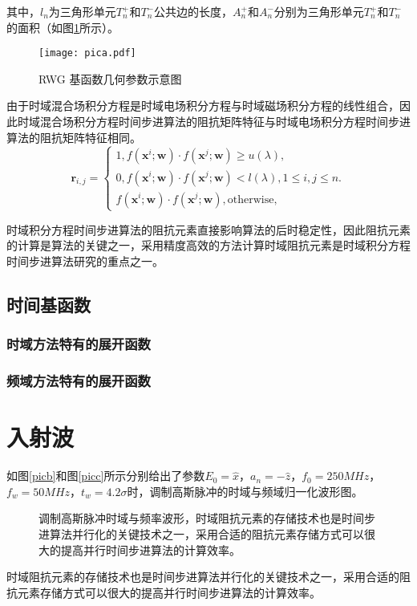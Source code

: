 \documentclass{standalone}
\begin{document}
其中，$l_n$为三角形单元$T_n^+$和$T_n^-$公共边的长度，$A_n^+$和$A_n^-$分别为三角形单元$T_n^+$和$T_n^-$的面积（如图\ref{pica}所示）。

\begin{figure}[h]
	\texttt{[image: pica.pdf]}
	\caption{RWG 基函数几何参数示意图}
	\label{pica}
\end{figure}
由于时域混合场积分方程是时域电场积分方程与时域磁场积分方程的线性组合，因此时域混合场积分方程时间步进算法的阻抗矩阵特征与时域电场积分方程时间步进算法的阻抗矩阵特征相同。
\begin{equation}
\label{latent_binary_variable}
\mathbf{r}_{i,j}=
\begin{cases}
1,f(\mathbf{x}^{i};\mathbf{w})\cdot f(\mathbf{x}^{j};\mathbf{w})\geq u(\lambda),\\
0,f(\mathbf{x}^{i};\mathbf{w})\cdot f(\mathbf{x}^{j};\mathbf{w})< l(\lambda), 1\leq i,j\leq n.\\
f(\mathbf{x}^{i};\mathbf{w})\cdot f(\mathbf{x}^{j};\mathbf{w}),\text{otherwise},
\end{cases}
\end{equation}

时域积分方程时间步进算法的阻抗元素直接影响算法的后时稳定性，因此阻抗元素的计算是算法的关键之一，采用精度高效的方法计算时域阻抗元素是时域积分方程时间步进算法研究的重点之一。


\subsection{时间基函数}

\subsubsection{时域方法特有的展开函数}

\subsubsection{频域方法特有的展开函数}

\section{入射波}

如图\ref{picb}和图\ref{picc}所示分别给出了参数$E_0=\hat{x}$，$a_n=-\hat{z}$，$f_0=250MHz$，$f_w=50MHz$，$t_w=4.2\sigma$时，调制高斯脉冲的时域与频域归一化波形图。

\begin{figure}[h]
	\caption{调制高斯脉冲时域与频率波形，时域阻抗元素的存储技术也是时间步进算法并行化的关键技术之一，采用合适的阻抗元素存储方式可以很大的提高并行时间步进算法的计算效率。}
	\label{fig1}
\end{figure}
时域阻抗元素的存储技术也是时间步进算法并行化的关键技术之一，采用合适的阻抗元素存储方式可以很大的提高并行时间步进算法的计算效率。
\end{document}
